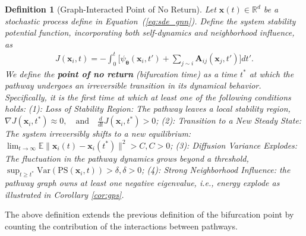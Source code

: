 \documentclass{article} %
\newtheorem{defn}{Definition} %
\begin{document}
\begin{defn}[Graph-Interacted Point of No Return] Let $\mathbf{x}(t) \in \mathbb{R}^d$ be a stochastic process
define in Equation~(\ref{eq:sde_gnn}). Define the system stability potential function, incorporating both self-dynamics and neighborhood influence, as 
\begin{align} J(\mathbf{x}_i, t) = - \int_0^t \Big[ \psi_{\boldsymbol{\theta}} (\mathbf{x}_i, t') + \sum_{j\sim i} \mathbf A_{ij}  (\mathbf{x}_j, t') \Big] dt'. 
\end{align} 
We define the \textbf{point of no return} (bifurcation time) as a time $t^*$ at which the pathway undergoes an irreversible transition in its dynamical behavior. Specifically, it is the first time at which at least one of the following conditions holds:
(1): Loss of Stability Region: The pathway leaves a local stability region, $\nabla J(\mathbf{x}_i, t^*) \approx 0, \quad \text{and} \quad \frac{d}{dt} J(\mathbf{x}_i, t^*) > 0$; (2): Transition to a New Steady State: The system irreversibly shifts to a new equilibrium: $\lim_{t \rightarrow \infty} \mathbb{E} \|\mathbf{x}_i(t) - \mathbf{x}_i(t^*)\|^2 > C,  C > 0$; (3): Diffusion Variance Explodes: The fluctuation in the pathway dynamics grows beyond a threshold, $\sup_{t \geq t^*} \mathrm{Var}(\mathrm{PS}(\mathbf{x}_i, t)) > \delta,  \delta > 0$; (4):
Strong Neighborhood Influence: the pathway graph owns at least one negative eigenvalue, i.e., energy explode as illustrated in Corollary \ref{cor:gps}.
\end{defn}

The above definition extends the previous definition of the bifurcation point by counting the contribution of the interactions between pathways. 
\end{document}
